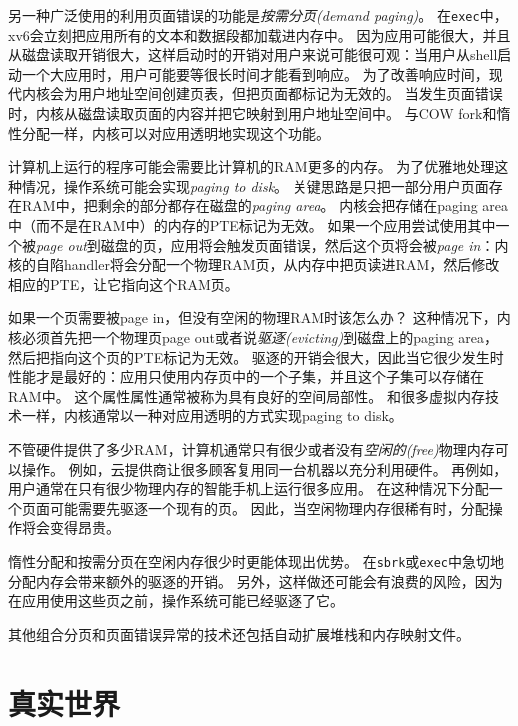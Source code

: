 另一种广泛使用的利用页面错误的功能是\emph{按需分页(demand paging)}。
在\texttt{exec}中，xv6会立刻把应用所有的文本和数据段都加载进内存中。
因为应用可能很大，并且从磁盘读取开销很大，这样启动时的开销对用户来说可能很可观：当用户从shell启动一个大应用时，用户可能要等很长时间才能看到响应。
为了改善响应时间，现代内核会为用户地址空间创建页表，但把页面都标记为无效的。
当发生页面错误时，内核从磁盘读取页面的内容并把它映射到用户地址空间中。
与COW fork和惰性分配一样，内核可以对应用透明地实现这个功能。

计算机上运行的程序可能会需要比计算机的RAM更多的内存。
为了优雅地处理这种情况，操作系统可能会实现\emph{paging to disk}。
关键思路是只把一部分用户页面存在RAM中，把剩余的部分都存在磁盘的\emph{paging area}。
内核会把存储在paging area中（而不是在RAM中）的内存的PTE标记为无效。
如果一个应用尝试使用其中一个被\emph{page out}到磁盘的页，应用将会触发页面错误，然后这个页将会被\emph{page in}：内核的自陷handler将会分配一个物理RAM页，从内存中把页读进RAM，然后修改相应的PTE，让它指向这个RAM页。

如果一个页需要被page in，但没有空闲的物理RAM时该怎么办？
这种情况下，内核必须首先把一个物理页page out或者说\emph{驱逐(evicting)}到磁盘上的paging area，然后把指向这个页的PTE标记为无效。
驱逐的开销会很大，因此当它很少发生时性能才是最好的：应用只使用内存页中的一个子集，并且这个子集可以存储在RAM中。
这个属性属性通常被称为具有良好的空间局部性。
和很多虚拟内存技术一样，内核通常以一种对应用透明的方式实现paging to disk。

不管硬件提供了多少RAM，计算机通常只有很少或者没有\emph{空闲的(free)}物理内存可以操作。
例如，云提供商让很多顾客复用同一台机器以充分利用硬件。
再例如，用户通常在只有很少物理内存的智能手机上运行很多应用。
在这种情况下分配一个页面可能需要先驱逐一个现有的页。
因此，当空闲物理内存很稀有时，分配操作将会变得昂贵。

惰性分配和按需分页在空闲内存很少时更能体现出优势。
在\texttt{sbrk}或\texttt{exec}中急切地分配内存会带来额外的驱逐的开销。
另外，这样做还可能会有浪费的风险，因为在应用使用这些页之前，操作系统可能已经驱逐了它。

其他组合分页和页面错误异常的技术还包括自动扩展堆栈和内存映射文件。

\section{真实世界}

